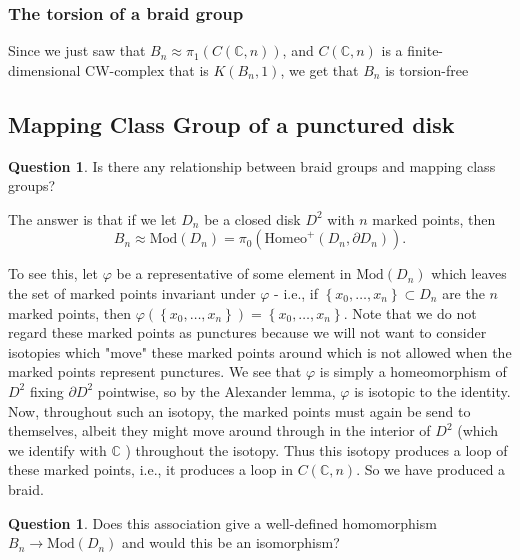 \documentclass[reqno]{amsart}
\theoremstyle{definition}
\newtheorem{question}[theorem]{Question}
\theoremstyle{remark}
\newcommand{\Mod}{{\mathrm{Mod}}}
\newcommand{\Homeo}{{\mathrm{Homeo}}}
\begin{document}
\subsubsection{The torsion of a braid group}

Since we just saw that
$B_n \approx \pi_1 \left( C \left( \mathbb{C},n \right)  \right) $,
and $C \left( \mathbb{C},n \right) $ 
is a finite-dimensional CW-complex that
is $K\left( B_n, 1 \right) $, we get that
$B_n$ is torsion-free~\cite[Prop~2.45]{Hatcher}


\subsection{Mapping Class Group of a punctured disk}

\begin{question}
    Is there any relationship between braid groups and
    mapping class groups?
\end{question}



The answer is that if we
let $D_n$ be a closed disk $D^2$ with $n$ marked points,
then
\[
B_n \approx \Mod\left( D_n \right) =
\pi_0 \left( \Homeo^{+} \left( D_n, \partial D_n \right)  \right).
\] 

To see this, let $\varphi$ be a representative
of some element in $\Mod \left( D_n \right) $ which
leaves the set of marked points invariant under
$\varphi$ - i.e., if $\left\{ x_0, \ldots,x_n \right\} 
\subset D_n$ are the $n$ marked points, then
$\varphi \left( \left\{ x_0, \ldots,x_n \right\}  \right) 
= \left\{ x_0, \ldots, x_n \right\} $. Note that we
do not regard these marked points as punctures because
we will not want to consider isotopies which "move" these
marked points around which is not allowed when the marked points
represent punctures.
We see that
$\varphi $ is simply a homeomorphism of $D^2$ fixing
$\partial D^2$ pointwise, so by the Alexander
lemma, $\varphi $ is isotopic to the identity. Now, throughout
such an isotopy, the marked points must again be send to
themselves, albeit they might move around through
in the interior of $D^2 $ (which we identify with
$\mathbb{C}$ ) throughout the isotopy. Thus
this isotopy produces a loop of these marked points,
i.e., it produces a loop in $C \left( \mathbb{C},n \right) $.
So we have produced a braid.

\begin{question}\label{question-1}
    Does this association give a well-defined homomorphism
    $B_n \to \Mod(D_n) $ and would this be an isomorphism?
\end{question}
\end{document}
